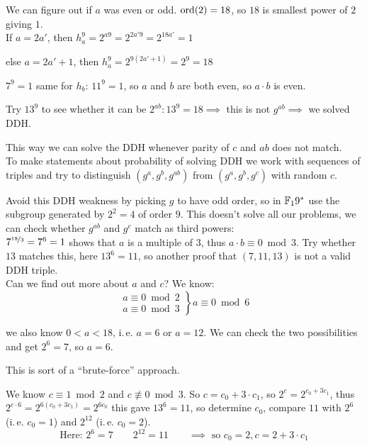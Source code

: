 We can figure out if $a$ was even or odd. $\operatorname{ord}(2) = 18$, so $18$ is smallest power of $2$ giving $1$. \\

If $a = 2a'$, then $h_a^9 = 2^{a 9} = 2^{2a' 9} = 2^{18a'} = 1$

else $a = 2a'+1$, then $h_a^9 = 2^{9(2a'+1)} = 2^{9} = 18$

$7^9 = 1$ same for $h_b$: $11^9 = 1$, so $a$ and $b$ are both even, so $a \cdot b$ is even.

Try $13^9$ to see whether it can be $2^{ab}: 13^9 = 18 \implies$ this is not $g^{ab} \implies$ we solved \textsc{DDH}.

This way we can solve the \textsc{DDH} whenever parity of $c$ and $ab$ does not match. \\

To make statements about probability of solving  \textsc{DDH} we work with sequences of triples and try to distinguish $(g^a, g^b,g^{ab})$ from $(g^a, g^b,g^c)$ with random $c$.

Avoid this \textsc{DDH} weakness by picking $g$ to have odd order, so in $\mathbb{F}_19^{\ast}$ use the subgroup generated by $2^2 = 4$ of order $9$. This doesn't solve all our problems, we can check whether $g^{ab}$ and $g^c$ match as third powers: \\

$7^{\nicefrac{18}{3}} = 7^6 = 1$ shows that $a$ is a multiple of $3$, thus $a \cdot b \equiv 0 \bmod 3$. Try whether $13$ matches this, here $13^6 = 11$, so another proof that $(7,11,13)$ is not a valid \textsc{DDH} triple. \\

Can we find out more about $a$ and $c$? We know:
\[
\left. \begin{array}{l} a \equiv 0 \bmod 2\\
a \equiv 0 \bmod 3  \end{array}\right\} a \equiv 0 \bmod 6 
\]

we also  know $0<a< 18$, i.\,e. $a=6$ or $a=12$. We can check the two possibilities and get $2^6 = 7$, so $a=6$.

\begin{remark}
This is sort of a ``brute-force'' approach.
\end{remark}

We know $c \equiv 1 \bmod 2$ and $c \not\equiv 0 \bmod 3$. So $c = c_0 + 3 \cdot c_1$, so $2^c = 2^{c_0 + 3 c_1}$, thus $2^{c \cdot 6} = 2^{6(c_0 + 3 c_1)} = 2^{6c_0}$ this gave $13^6=11$, so determine $c_0$, compare $11$ with $2^6$ (i.\,e. $c_0=1$) and $2^{12}$ (i.\,e. $c_0 = 2$).
\[
\text{Here: } 2^6 = 7 \qquad 2^{12} = 11 \qquad \implies \text{ so } c_0 = 2, c = 2 + 3 \cdot c_1
\]

